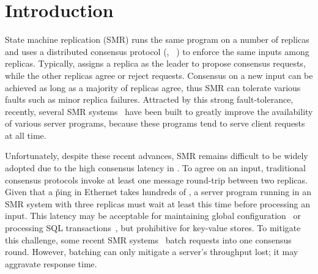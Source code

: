 \section{Introduction} \label{sec:intro}

State machine replication (SMR) runs the same program on a 
number of replicas and uses a distributed consensus protocol (\eg, 
\paxos~\cite{crane:sosp15}) to enforce the same inputs among 
replicas. Typically, \paxos assigns a replica as the leader to propose 
consensus requests, while the other replicas agree or reject requests. 
Consensus on a new input can be achieved as long as a majority of replicas 
agree, thus SMR can tolerate various faults such as minor replica 
failures. Attracted by this strong fault-tolerance, recently, several SMR 
systems~\cite{chubby:osdi, zookeeper, crane:sosp15, eve:osdi12, rex:eurosys14} 
have been built to greatly improve the availability of various server programs, 
because these programs tend to serve client requests at all time.

Unfortunately, despite these recent advances, SMR remains difficult to be 
widely adopted due to the high consensus latency in \paxos. To agree on an 
input, traditional consensus protocols invoke at least one message round-trip 
between two replicas. Given that a \v{ping} in Ethernet takes hundreds of \us, a 
server program running in an SMR system with three replicas must wait at 
least this time before processing an input. This latency may be acceptable for 
maintaining global configuration~\cite{chubby:osdi,zookeeper} or processing SQL 
transactions~\cite{crane:sosp15,eve:osdi12}, but prohibitive for 
key-value stores. To mitigate this challenge, some recent SMR 
systems~\cite{calvin:sigmod12,rex:eurosys14} batch requests into one 
consensus round. However, batching can only mitigate a server's throughput 
lost; it may aggravate response time. 


